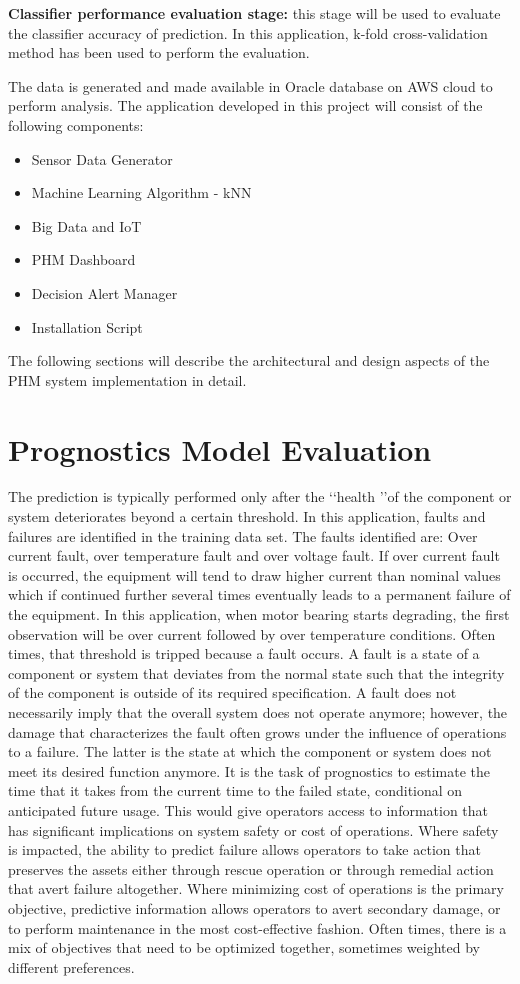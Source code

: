 \documentclass[sigconf]{acmart}
\begin{document}
\textbf{Classifier performance evaluation stage:} this stage will be used to evaluate the classifier accuracy of prediction. In this application, k-fold cross-validation method has been used to perform the evaluation.

The data is generated and made available in Oracle database on AWS cloud to perform analysis. The application developed in this project will consist of the following components:
\begin{itemize}
  \item Sensor Data Generator
  \item Machine Learning Algorithm - kNN
  \item Big Data and IoT
  \item PHM Dashboard
  \item Decision Alert Manager
  \item Installation Script
 \end{itemize}

The following sections will describe the architectural and design aspects of the PHM system implementation in detail.

\section{Prognostics Model Evaluation}
\cite{Saxena2009} The prediction is typically performed only after the \lq\lq health \rq\rq of the component or system deteriorates beyond a certain threshold. In this application, faults and failures are identified in the training data set. The faults identified are: Over current fault, over temperature fault and over voltage fault. If over current fault is occurred, the equipment will tend to draw higher current than nominal values which if continued further several times eventually leads to a permanent failure of the equipment. In this application, when motor bearing starts degrading, the first observation will be over current followed by over temperature conditions.
Often times, that threshold is tripped because a fault occurs. A fault is a state of a component or system that deviates from the normal state such that the integrity of the component is outside of its required specification. A fault does not necessarily imply that the overall system does not operate anymore; however, the damage that characterizes the fault often grows under the influence of operations to a failure. The latter is the state at which the component or system does not meet its desired function anymore. It is the task of prognostics to estimate the time that it takes from the current time to the failed state, conditional on anticipated future usage. This would give operators access to information that has significant implications on system safety or cost of operations. Where safety is impacted, the ability to predict failure allows operators to take action that preserves the assets either through rescue operation or through remedial action that avert failure altogether. Where minimizing cost of operations is the primary objective, predictive information allows operators to avert secondary damage, or to perform maintenance in the most cost-effective fashion. Often times, there is a mix of objectives that need to be optimized together, sometimes weighted by different preferences.
\end{document}
